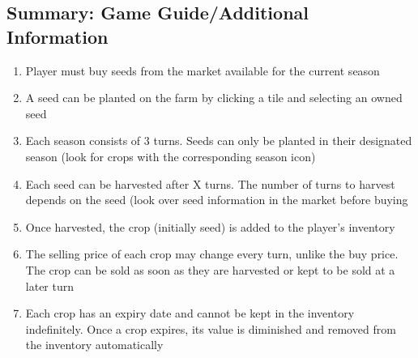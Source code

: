 \documentclass{article}
\begin{document}
\subsection{Summary: Game Guide/Additional Information} \label{guide}
\begin{enumerate}
    \item Player must buy seeds from the market available for the current season
    \item A seed can be planted on the farm by clicking a tile and selecting an owned seed
    \item Each season consists of 3 turns. Seeds can only be planted in their designated season (look for crops with the corresponding season icon)
    \item Each seed can be harvested after X turns. The number of turns to harvest depends on the seed (look over seed information in the market before buying
    \item Once harvested, the crop (initially seed) is added to the player's inventory
    \item The selling price of each crop may change every turn, unlike the buy price. The crop can be sold as soon as they are harvested or kept to be sold at a later turn
    \item Each crop has an expiry date and cannot be kept in the inventory indefinitely. Once a crop expires, its value is diminished and removed from the inventory automatically
\end{enumerate}
\end{document}
